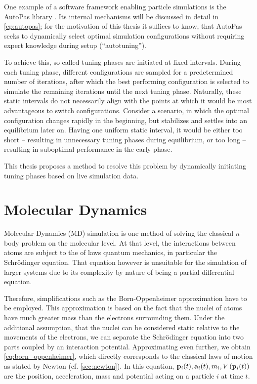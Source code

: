 One example of a software framework enabling particle simulations is the AutoPas library \cite{Gratl2019}. Its internal mechanisms will be discussed in detail in \autoref{cp:autopas}; for the motivation of this thesis it suffices to know, that AutoPas seeks to dynamically select optimal simulation configurations without requiring expert knowledge during setup (\enquote{autotuning}).

To achieve this, so-called tuning phases are initiated at fixed intervals. During each tuning phase, different configurations are sampled for a predetermined number of iterations, after which the best performing configuration is selected to simulate the remaining iterations until the next tuning phase. Naturally, these static intervals do not necessarily align with the points at which it would be most advantageous to switch configurations. Consider a scenario, in which the optimal configuration changes rapidly in the beginning, but stabilizes and settles into an equilibrium later on. Having one uniform static interval, it would be either too short -- resulting in unnecessary tuning phases during equilibrium, or too long -- resulting in suboptimal performance in the early phase.

This thesis proposes a method to resolve this problem by dynamically initiating tuning phases based on live simulation data.


\section{Molecular Dynamics}
\label{sec:md}
Molecular Dynamics (MD) simulation is one method of solving the classical $n$-body problem on the molecular level. At that level, the interactions between atoms are subject to the of laws quantum mechanics, in particular the Schrödinger equation. That equation however is unsuitable for the simulation of larger systems due to its complexity by nature of being a partial differential equation.

Therefore, simplifications such as the Born-Oppenheimer approximation have to be employed. This approximation is based on the fact that the nuclei of atoms have much greater mass than the electrons surrounding them. Under the additional assumption, that the nuclei can be considered static relative to the movements of the electrons, we can separate the Schrödinger equation into two parts coupled by an interaction potential. Approximating even further, we obtain \eqref{eq:born_oppenheimer}, which directly corresponds to the classical laws of motion as stated by Newton (cf. \autoref{sec:newton}). In this equation, $\mathbf{p}_i(t), \mathbf{a}_i(t), m_i, V\left(\mathbf{p}_i(t)\right)$ are the position, acceleration, mass and potential acting on a particle $i$ at time $t$. \cite{Born1927, Voorhis2005, Griebel2007} 

